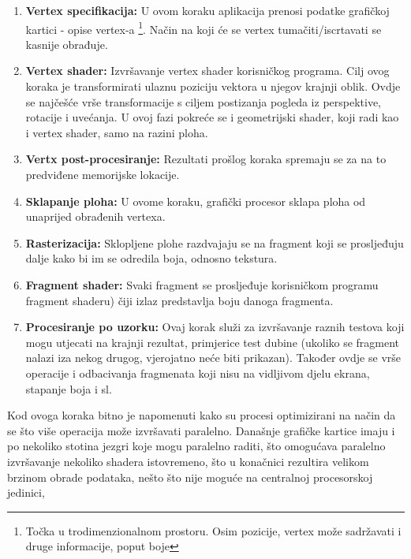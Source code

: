 \begin{enumerate}
\item \textbf{Vertex specifikacija:} U ovom koraku aplikacija prenosi podatke grafičkoj kartici - opise vertex-a \footnote{Točka u trodimenzionalnom prostoru. Osim pozicije, vertex može sadržavati i druge informacije, poput boje}. Način na koji će se vertex tumačiti/iscrtavati se kasnije obrađuje.

\item \textbf{Vertex shader:} Izvršavanje vertex shader korisničkog programa. Cilj ovog koraka je transformirati ulaznu poziciju vektora u njegov krajnji oblik. Ovdje se najčešće vrše transformacije s ciljem postizanja pogleda iz perspektive, rotacije i uvećanja. U ovoj fazi pokreće se i geometrijski shader, koji radi kao i vertex shader, samo na razini ploha.

\item \textbf{Vertx post-procesiranje:} Rezultati prošlog koraka spremaju se za na to predviđene memorijske lokacije.

\item \textbf{Sklapanje ploha:} U ovome koraku, grafički procesor sklapa ploha od unaprijed obrađenih vertexa.

\item \textbf{Rasterizacija:} Sklopljene plohe razdvajaju se na fragment koji se prosljeđuju dalje kako bi im se odredila boja, odnosno tekstura.

\item \textbf{Fragment shader:} Svaki fragment se prosljeđuje korisničkom programu fragment shaderu) čiji izlaz predstavlja boju danoga fragmenta.

\item \textbf{Procesiranje po uzorku:} Ovaj korak služi za izvršavanje raznih testova koji mogu utjecati na krajnji rezultat, primjerice test dubine (ukoliko se fragment nalazi iza nekog drugog, vjerojatno neće biti prikazan). Također ovdje se vrše operacije i odbacivanja fragmenata koji nisu na vidljivom djelu ekrana, stapanje boja i sl.

\end{enumerate}

Kod ovoga koraka bitno je napomenuti kako su procesi optimizirani na način da se što više operacija može izvršavati paralelno. Današnje grafičke kartice imaju i po nekoliko stotina jezgri koje mogu paralelno raditi, što omogućava paralelno izvršavanje nekoliko shadera istovremeno, što u konačnici rezultira velikom brzinom obrade podataka, nešto što nije moguće na centralnoj procesorskoj jedinici,

